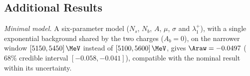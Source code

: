 \subsection{Additional Results}
\emph{Minimal model.} A six-parameter model ($N_s$, $N_b$, $A$, $\mu$, $\sigma$ and $\lambda_1^+$), with a single exponential background shared by the two charges ($A_b=0$), on the narrower window $[5150,5450]\,\MeV$ instead of $[5100,5600]\,\MeV$, gives $\Araw=-0.0497$ ($68\%$ credible interval $[-0.058,-0.041]$), compatible with the nominal result within its uncertainty.
